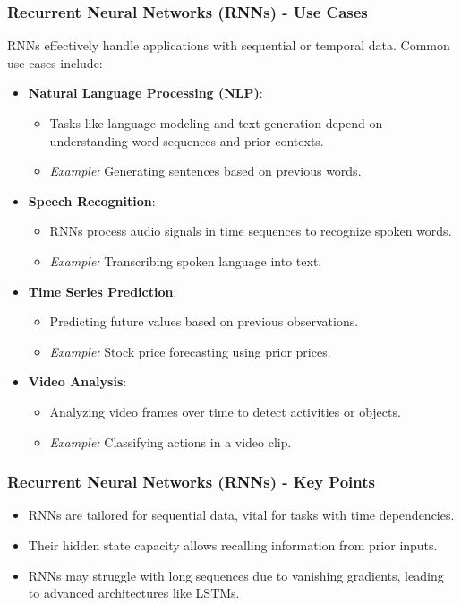 \documentclass{beamer}
\begin{document}
\begin{frame}[fragile]
    \frametitle{Recurrent Neural Networks (RNNs) - Use Cases}
    RNNs effectively handle applications with sequential or temporal data. Common use cases include:
    
    \begin{itemize}
        \item \textbf{Natural Language Processing (NLP)}:
        \begin{itemize}
            \item Tasks like language modeling and text generation depend on understanding word sequences and prior contexts.
            \item \textit{Example:} Generating sentences based on previous words.
        \end{itemize}
        
        \item \textbf{Speech Recognition}:
        \begin{itemize}
            \item RNNs process audio signals in time sequences to recognize spoken words.
            \item \textit{Example:} Transcribing spoken language into text.
        \end{itemize}
        
        \item \textbf{Time Series Prediction}:
        \begin{itemize}
            \item Predicting future values based on previous observations.
            \item \textit{Example:} Stock price forecasting using prior prices.
        \end{itemize}
        
        \item \textbf{Video Analysis}:
        \begin{itemize}
            \item Analyzing video frames over time to detect activities or objects.
            \item \textit{Example:} Classifying actions in a video clip.
        \end{itemize}
    \end{itemize}
\end{frame}

\begin{frame}[fragile]
    \frametitle{Recurrent Neural Networks (RNNs) - Key Points}
    \begin{itemize}
        \item RNNs are tailored for sequential data, vital for tasks with time dependencies.
        \item Their hidden state capacity allows recalling information from prior inputs.
        \item RNNs may struggle with long sequences due to vanishing gradients, leading to advanced architectures like LSTMs.
    \end{itemize}
\end{frame}
\end{document}
